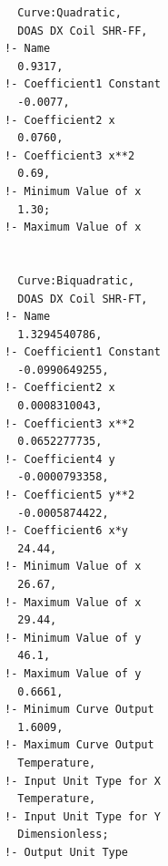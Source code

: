 \begin{lstlisting}
  Curve:Quadratic,
  DOAS DX Coil SHR-FF,                                                                         !- Name
  0.9317,                                                                                                   !- Coefficient1 Constant
  -0.0077,                                                                                                   !- Coefficient2 x
  0.0760,                                                                                                   !- Coefficient3 x**2
  0.69,                                                                                                       !- Minimum Value of x
  1.30;                                                                                                       !- Maximum Value of x


  Curve:Biquadratic,
  DOAS DX Coil SHR-FT,                                                                         !- Name
  1.3294540786,                                                                                       !- Coefficient1 Constant
  -0.0990649255,                                                                                     !- Coefficient2 x
  0.0008310043,                                                                                       !- Coefficient3 x**2
  0.0652277735,                                                                                       !- Coefficient4 y
  -0.0000793358,                                                                                     !- Coefficient5 y**2
  -0.0005874422,                                                                                     !- Coefficient6 x*y
  24.44,                                                                                                     !- Minimum Value of x
  26.67,                                                                                                     !- Maximum Value of x
  29.44,                                                                                                     !- Minimum Value of y
  46.1,                                                                                                       !- Maximum Value of y
  0.6661,                                                                                                   !- Minimum Curve Output
  1.6009,                                                                                                   !- Maximum Curve Output
  Temperature,                                                                                         !- Input Unit Type for X
  Temperature,                                                                                         !- Input Unit Type for Y
  Dimensionless;                                                                                     !- Output Unit Type
\end{lstlisting}

